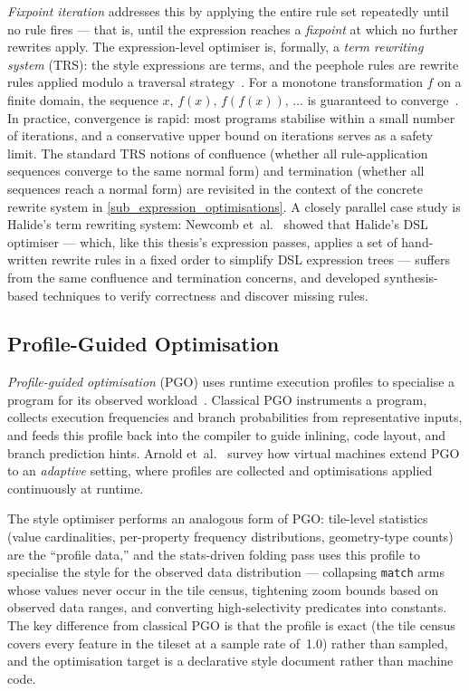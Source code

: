 \begin{sloppypar}
\emph{Fixpoint iteration} addresses this by applying the entire rule set repeatedly until no rule fires --- that is, until the expression reaches a \emph{fixpoint} at which no further rewrites apply.
The expression-level optimiser is, formally, a \emph{term rewriting system} (TRS): the style expressions are terms, and the peephole rules are rewrite rules applied modulo a traversal strategy~\cite{baaderTermRewritingAll1998}.
For a monotone transformation $f$ on a finite domain, the sequence $x,\, f(x),\, f(f(x)),\, \ldots$ is guaranteed to converge~\cite{ahoCompilersPrinciplesTechniques2007}.
In practice, convergence is rapid: most programs stabilise within a small number of iterations, and a conservative upper bound on iterations serves as a safety limit.
The standard TRS notions of confluence (whether all rule-application sequences converge to the same normal form) and termination (whether all sequences reach a normal form) are revisited in the context of the concrete rewrite system in \cref{sub_expression_optimisations}.
A closely parallel case study is Halide's term rewriting system: Newcomb et~al.~\cite{newcombVerifyingImprovingHalide2020} showed that Halide's DSL optimiser --- which, like this thesis's expression passes, applies a set of hand-written rewrite rules in a fixed order to simplify DSL expression trees --- suffers from the same confluence and termination concerns, and developed synthesis-based techniques to verify correctness and discover missing rules.
\end{sloppypar}


\subsection{Profile-Guided Optimisation}\label{sub_pgo}

\emph{Profile-guided optimisation} (PGO) uses runtime execution profiles to specialise a program for its observed workload~\cite{changUsingProfileInformation1991}.
Classical PGO instruments a program, collects execution frequencies and branch probabilities from representative inputs, and feeds this profile back into the compiler to guide inlining, code layout, and branch prediction hints.
Arnold et~al.~\cite{arnoldSurveyAdaptiveOptimization2005} survey how virtual machines extend PGO to an \emph{adaptive} setting, where profiles are collected and optimisations applied continuously at runtime.

The style optimiser performs an analogous form of PGO: tile-level statistics (value cardinalities, per-property frequency distributions, geometry-type counts) are the ``profile data,'' and the stats-driven folding pass uses this profile to specialise the style for the observed data distribution --- collapsing \texttt{match} arms whose values never occur in the tile census, tightening zoom bounds based on observed data ranges, and converting high-selectivity predicates into constants.
The key difference from classical PGO is that the profile is exact (the tile census covers every feature in the tileset at a sample rate of~1.0) rather than sampled, and the optimisation target is a declarative style document rather than machine code.

